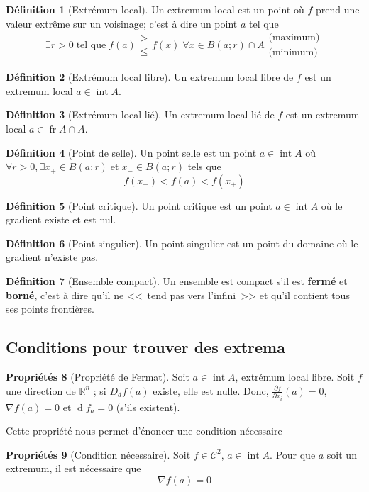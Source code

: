 \documentclass[11pt,a4paper]{article}
\theoremstyle{definition}
\newtheorem{mydef}{Définition}%
\newtheorem{myprop}[mydef]{Propriétés}
\DeclareMathOperator{\newint}{int}
\DeclareMathOperator{\newfr}{fr}
\DeclareMathOperator{\diff}{d}
\newcommand{\dif}{\diff\!}
\newcommand{\pa}{\partial}
\newcommand{\R}{\mathbb{R}}
\begin{document}
\begin{mydef}[Extrémum local] Un extremum local est un point où $f$ prend une valeur extrême sur un voisinage; c'est à dire un point $a$ tel que
	\[ \exists r >0 \; \text{tel que} \; f(a) \begin{array}{l} \geq \\ \leq \end{array} f(x) \; \forall x \in B(a;r) \cap A \begin{array}{l} \text{(maximum)} \\ \text{(minimum)}
	\end{array} \]
\end{mydef}

\begin{mydef}[Extrémum local libre]
	Un extremum local libre de $f$ est un extremum local $a \in \newint A$.
\end{mydef}

\begin{mydef}[Extrémum local lié]
	Un extremum local lié de $f$ est un extremum local $a \in \newfr A \cap A$.
\end{mydef}

\begin{mydef}[Point de selle]
	Un point selle est un point $a \in \newint A$ où $\forall r > 0, \exists x_+ \in B(a;r) \; \text{et} \; x_- \in B(a;r)$ tels que
	\[ f(x_-) < f(a) < f(x_+) \]
\end{mydef}

\begin{mydef}[Point critique]
	Un point critique est un point $a \in \newint A$ où le gradient existe et est nul.
\end{mydef}

\begin{mydef}[Point singulier]
	Un point singulier est un point du domaine où le gradient n'existe pas.
\end{mydef}

\begin{mydef}[Ensemble compact]
	Un  ensemble est compact s'il est \textbf{fermé} et \textbf{borné},
	c'est à dire qu'il ne <<~tend pas vers l'infini~>> et qu'il contient tous ses points frontières.
\end{mydef}

\subsection{Conditions pour trouver des extrema}

\begin{myprop}[Propriété de Fermat]
	Soit $a \in \newint A$, extrémum local libre. Soit $f$ une direction de $\R^n$ ; si $D_df(a)$ existe, elle est nulle. Donc, $\frac{\pa f}{\pa x_i}(a) = 0$, $\nabla f(a) = 0$ et $\dif f_a = 0$ (s'ils existent).
\end{myprop}
Cette propriété nous permet d'énoncer une condition nécessaire
\begin{myprop}[Condition nécessaire]
	Soit $f \in \mathcal{C}^2$, $a \in \newint A$. Pour que $a$ soit un extremum, il est nécessaire que
	\[ \nabla f(a) = 0 \]
\end{myprop}
\end{document}
